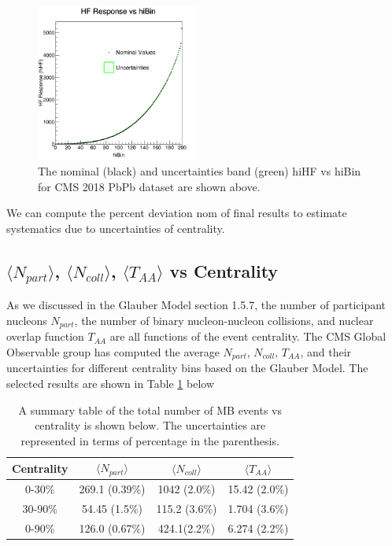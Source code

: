 \begin{figure}[h]
\begin{center}
\includegraphics[width= 0.48\textwidth]{Figures/Chapter5/hiHFvsCent.png}
\caption{The nominal (black) and uncertainties band (green) hiHF vs hiBin for CMS 2018 PbPb dataset are shown above.}
\label{hiHFvsCent}
\end{center}
\end{figure}


We can compute the percent deviation nom of final results to estimate systematics due to uncertainties of centrality. 


\subsection{$\langle N_{part} \rangle$, $\langle N_{coll} \rangle$, $\langle T_{AA} \rangle$ vs Centrality}

As we discussed in the Glauber Model \cite{CentPlot,Glauber} section 1.5.7, the number of participant nucleons $N_{part}$, the number of binary nucleon-nucleon collisions, and nuclear overlap function $T_{AA}$ are all functions of the event centrality. The CMS Global Observable group has computed the average $N_{part} $, $N_{coll} $, $T_{AA}$, and their uncertainties  for different centrality bins based on the Glauber Model. The selected results are shown in Table \ref{GOvsCent} below


\begin{table}[h]
\begin{center}
\caption{A summary table of the total number of MB events vs centrality is shown below. The uncertainties are represented in terms of percentage in the parenthesis.}
\vspace{1em}
\label{GOvsCent}
  \begin{tabular}{ |c | c| c| c|}
    \hline 
Centrality &  $\langle N_{part} \rangle$ &$\langle N_{coll} \rangle$  & $\langle T_{AA} \rangle$  \\
     \hline
         \hline
0-30\% &  269.1 (0.39\%)  &  1042 (2.0\%) &	15.42 (2.0\%)   \\
30-90\% & 54.45 (1.5\%)   & 115.2 (3.6\%)  &   1.704 (3.6\%)  \\
0-90\% & 126.0 (0.67\%)   &  424.1(2.2\%)  &    6.274 (2.2\%)  \\
     \hline
    \hline
\end{tabular}
\end{center}
\end{table}

